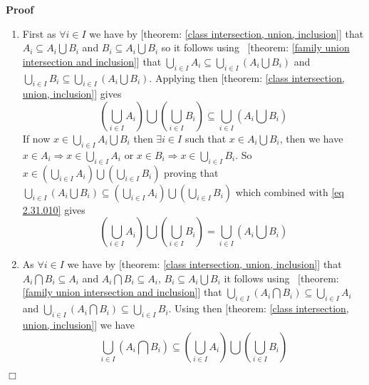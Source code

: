 \documentclass{book}
\newenvironment{proof}{\noindent\textbf{Proof\ }}{\hspace*{\fill}$\Box$\medskip}
\begin{document}
\begin{proof}
  
  \begin{enumerate}
    \item First as $\forall i \in I$ we have by [theorem: \ref{class
    intersection, union, inclusion}] that $A_i \subseteq A_i \bigcup B_i$ and
    $B_i \subseteq A_i \bigcup B_i$ so it follows using \ [theorem:
    \ref{family union intersection and inclusion}] that $\bigcup_{i \in I} A_i
    \subseteq \bigcup_{i \in I} \left( A_i \bigcup B_i \right)$ and
    $\bigcup_{i \in I} B_i \subseteq \bigcup_{i \in I} \left( A_i \bigcup B_i
    \right)$. Applying then [theorem: \ref{class intersection, union,
    inclusion}] gives
    \begin{equation}
      \label{eq 2.31.010} \left( \bigcup_{i \in I} A_i \right) \bigcup \left(
      \bigcup_{i \in I} B_i \right) \subseteq \bigcup_{i \in I} \left( A_i
      \bigcup B_i \right)
    \end{equation}
    If now $x \in \bigcup_{i \in I} A_i \bigcup B_i$ then $\exists i \in I$
    such that $x \in A_i \bigcup B_i$, then we have $x \in A_i \Rightarrow x
    \in \bigcup_{i \in I} A_i$ or $x \in B_i \Rightarrow x \in \bigcup_{i \in
    I} B_i$. So $x \in \left( \bigcup_{i \in I} A_i \right) \bigcup \left(
    \bigcup_{i \in I} B_i \right)$ proving that $\bigcup_{i \in I} \left( A_i
    \bigcup B_i \right) \subseteq \left( \bigcup_{i \in I} A_i \right) \bigcup
    \left( \bigcup_{i \in I} B_i \right)$ which combined with \ref{eq
    2.31.010} gives
    \[ \left( \bigcup_{i \in I} A_i \right) \bigcup \left( \bigcup_{i \in I}
       B_i \right) = \bigcup_{i \in I} \left( A_i \bigcup B_i \right) \]
    \item  As $\forall i \in I$ we have by [theorem: \ref{class intersection,
    union, inclusion}] that $A_i \bigcap B_i \subseteq A_i$ and $A_i \bigcap
    B_i \subseteq A_i$, $B_i \subseteq A_i \bigcup B_i$ it follows using \
    [theorem: \ref{family union intersection and inclusion}] that $\bigcup_{i
    \in I} \left( A_i \bigcap B_i \right) \subseteq \bigcup_{i \in I} A_i$ and
    $\bigcup_{i \in I} \left( A_i \bigcap B_i \right) \subseteq \bigcup_{i \in
    I} B_i$. Using then [theorem: \ref{class intersection, union, inclusion}]
    we have
    \[ \bigcup_{i \in I} \left( A_i \bigcap B_i \right) \subseteq \left(
       \bigcup_{i \in I} A_i \right) \bigcup \left( \bigcup_{i \in I} B_i
       \right) \]
  \end{enumerate}
\end{proof}
\end{document}
